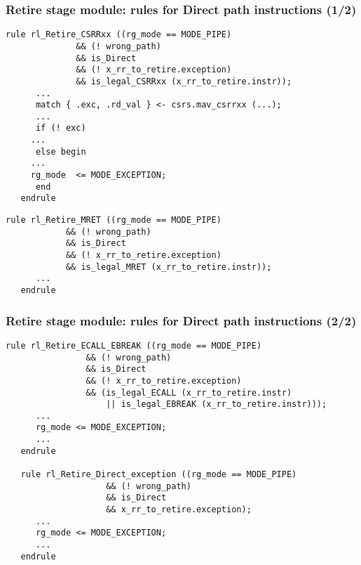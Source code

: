 
\begin{frame}[fragile]
\frametitle{Retire stage module: rules for Direct path instructions (1/2)}

\footnotesize

\begin{minipage}{0.725\textwidth}\scriptsize
\begin{Verbatim}[frame=single, label=From Code/src\_Fife/S5\_Retire.bsv]
   rule rl_Retire_CSRRxx ((rg_mode == MODE_PIPE)
			  && (! wrong_path)
			  && is_Direct
			  && (! x_rr_to_retire.exception)
			  && is_legal_CSRRxx (x_rr_to_retire.instr));
      ...
      match { .exc, .rd_val } <- csrs.mav_csrrxx (...);
      ...
      if (! exc)
	 ...
      else begin
	 ...
	 rg_mode  <= MODE_EXCEPTION;
      end
   endrule
\end{Verbatim}
\end{minipage}

\vspace{2ex}

\begin{minipage}{0.725\textwidth}\scriptsize
\begin{Verbatim}[frame=single, label=From Code/src\_Fife/S5\_Retire.bsv]
   rule rl_Retire_MRET ((rg_mode == MODE_PIPE)
			&& (! wrong_path)
			&& is_Direct
			&& (! x_rr_to_retire.exception)
			&& is_legal_MRET (x_rr_to_retire.instr));
      ...
   endrule
\end{Verbatim}
\end{minipage}

\end{frame}


\begin{frame}[fragile]
\frametitle{Retire stage module: rules for Direct path instructions (2/2)}

\footnotesize

\begin{minipage}{0.725\textwidth}\scriptsize
\begin{Verbatim}[frame=single, label=From Code/src\_Fife/S5\_Retire.bsv]
   rule rl_Retire_ECALL_EBREAK ((rg_mode == MODE_PIPE)
				&& (! wrong_path)
				&& is_Direct
				&& (! x_rr_to_retire.exception)
				&& (is_legal_ECALL (x_rr_to_retire.instr)
				    || is_legal_EBREAK (x_rr_to_retire.instr)));
      ...
      rg_mode <= MODE_EXCEPTION;
      ...
   endrule

   rule rl_Retire_Direct_exception ((rg_mode == MODE_PIPE)
				    && (! wrong_path)
				    && is_Direct
				    && x_rr_to_retire.exception);
      ...
      rg_mode <= MODE_EXCEPTION;
      ...
   endrule
\end{Verbatim}
\end{minipage}

\end{frame}

